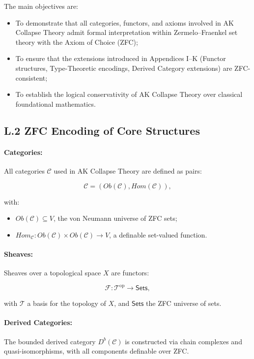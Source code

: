 \documentclass[11pt]{article}
\begin{document}
The main objectives are:

\begin{itemize}
    \item To demonstrate that all categories, functors, and axioms involved in AK Collapse Theory admit formal interpretation within Zermelo–Fraenkel set theory with the Axiom of Choice (ZFC);
    \item To ensure that the extensions introduced in Appendices I–K (Functor structures, Type-Theoretic encodings, Derived Category extensions) are ZFC-consistent;
    \item To establish the logical conservativity of AK Collapse Theory over classical foundational mathematics.
\end{itemize}

\subsection*{L.2 ZFC Encoding of Core Structures}

\paragraph{Categories:}  
All categories \( \mathcal{C} \) used in AK Collapse Theory are defined as pairs:

\[
\mathcal{C} = (Ob(\mathcal{C}), Hom(\mathcal{C})),
\]

with:

\begin{itemize}
    \item \( Ob(\mathcal{C}) \subseteq V \), the von Neumann universe of ZFC sets;
    \item \( Hom_{\mathcal{C}} : Ob(\mathcal{C}) \times Ob(\mathcal{C}) \to V \), a definable set-valued function.
\end{itemize}

\paragraph{Sheaves:}  
Sheaves over a topological space \( X \) are functors:

\[
\mathcal{F} : \mathcal{T}^{\mathrm{op}} \to \mathsf{Sets},
\]

with \( \mathcal{T} \) a basis for the topology of \( X \), and \( \mathsf{Sets} \) the ZFC universe of sets.

\paragraph{Derived Categories:}  
The bounded derived category \( D^b(\mathcal{C}) \) is constructed via chain complexes and quasi-isomorphisms, with all components definable over ZFC.
\end{document}
